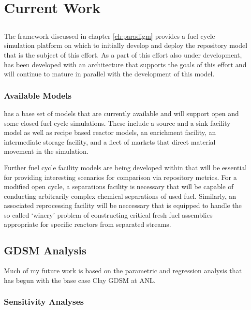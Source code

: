 \chapter{Current Work}\label{ch:current}

\section{\Cyclus}

The \Cyclus framework discussed in chapter \ref{ch:paradigm} provides a fuel 
cycle simulation platform on which to initially develop and deploy the 
repository model that is the subject of this effort. As a part of this effort 
also under development, \Cyclus has been developed with an architecture that 
supports the goals of this effort and will continue to mature in parallel with 
the development of this model.

\subsection{Available Models}

\Cyclus has a base set of models that are currently available and will support 
open and some closed fuel cycle simulations. These include a source and a sink 
facility model as well as recipe based reactor models, an enrichment facility, 
an intermediate storage facility, and a fleet of markets that direct material 
movement in the simulation.

Further fuel cycle facility models are being developed within \Cyclus  that 
will be essential for providing interesting scenarios for comparison via 
repository metrics. For a modified open cycle, a separations facility is 
necessary that will be capable of conducting arbitrarily complex chemical 
separations of used fuel. Similarly, an associated reprocessing facility  will 
be neccessary that is equipped to handle the so called `winery' problem of 
constructing critical fresh fuel assemblies appropriate for specific reactors 
from separated streams.


\section{GDSM Analysis}

Much of my future work is based on the parametric and regression analysis that
has begun with the base case Clay \gls{GDSM} at \gls{ANL}.

\subsection{Sensitivity Analyses}

